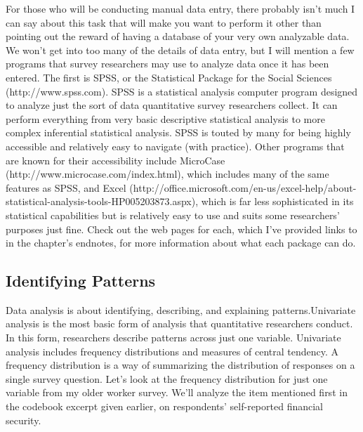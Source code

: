 For those who will be conducting manual data entry, there probably isn’t much I can say about this task that will make you want to perform it other than pointing out the reward of having a database of your very own analyzable data. We won’t get into too many of the details of data entry, but I will mention a few programs that survey researchers may use to analyze data once it has been entered. The first is SPSS, or the Statistical Package for the Social Sciences (http://www.spss.com). SPSS is a statistical analysis computer program designed to analyze just the sort of data quantitative survey researchers collect. It can perform everything from very basic descriptive statistical analysis to more complex inferential statistical analysis. SPSS is touted by many for being highly accessible and relatively easy to navigate (with practice). Other programs that are known for their accessibility include MicroCase (http://www.microcase.com/index.html), which includes many of the same features as SPSS, and Excel (http://office.microsoft.com/en-us/excel-help/about-statistical-analysis-tools-HP005203873.aspx), which is far less sophisticated in its statistical capabilities but is relatively easy to use and suits some researchers’ purposes just fine. Check out the web pages for each, which I’ve provided links to in the chapter’s endnotes, for more information about what each package can do.

\subsection{Identifying Patterns}

Data analysis is about identifying, describing, and explaining patterns.Univariate analysis is the most basic form of analysis that quantitative researchers conduct. In this form, researchers describe patterns across just one variable. Univariate analysis includes frequency distributions and measures of central tendency. A frequency distribution is a way of summarizing the distribution of responses on a single survey question. Let’s look at the frequency distribution for just one variable from my older worker survey. We’ll analyze the item mentioned first in the codebook excerpt given earlier, on respondents’ self-reported financial security.

